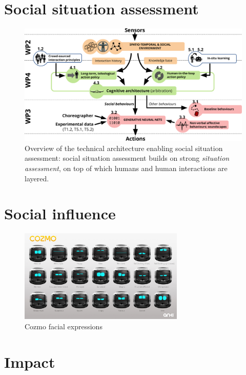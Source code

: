 \documentclass[11pt]{report}
\begin{document}
\section{Social situation assessment}

\begin{figure}
\centering
\includegraphics[width=0.9\linewidth]{figs/archi}
\caption{Overview of the technical architecture enabling social situation
    assessment: social situation assessment builds on strong \emph{situation
    assessment}, on top of which humans and human interactions are layered.}
\label{fig:social-situation-assessment}
\end{figure}


\section{Social influence}

\begin{figure}[!htbp]
\centering
    \includegraphics[width=0.7\textwidth]{figs/cozmo-expression-sheet.jpg}
\caption{Cozmo facial expressions}
\end{figure}


\section{Impact}\label{impact}
\end{document}
